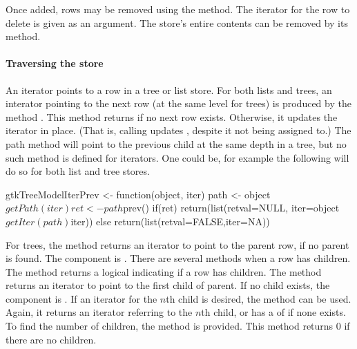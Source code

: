 Once added, rows may be removed using the
 method. The iterator for the row to
delete is given as an argument. The store's entire contents can be
removed by its  method.


\paragraph{Traversing the store}
An iterator points to a row in a tree or list store. For both lists
and trees, an interator pointing to the next row (at the same level
for trees) is produced by the method
. This method returns  if
no next row exists. Otherwise, it updates the iterator in place. (That
is, calling  updates ,
despite it not being assigned to.) The path method 
will point to the previous child at the same depth in a tree, but no
such method is defined for iterators. One could be, for example the
following will do so for both list and tree stores.

\begin{Schunk}
\begin{Sinput}
 gtkTreeModelIterPrev <- function(object, iter) {
   path <- object$getPath(iter)
   ret <- path$prev()
   if(ret)
     return(list(retval=NULL, iter=object$getIter(path)$iter))
   else
     return(list(retval=FALSE,iter=NA))
 }
\end{Sinput}
\end{Schunk}

For trees, the method  returns an
iterator to point to the parent row, if no parent is found. The
 component is .
There are several methods when a row has children.  The
method  returns a logical
indicating if a row has children. The method
 returns an iterator to point to
the first child of parent. If no child exists, the 
component is . If an iterator for the $n$th child is desired, the
method  can be used. Again, it returns
an iterator referring to the $n$th child, or has a  of
 if
none exists. To find the number of children, the method
 is provided. This method returns
$0$ if there are no children.

